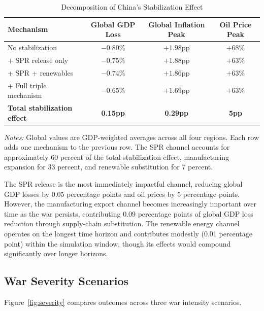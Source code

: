 \documentclass[12pt,a4paper]{article}
\begin{document}
\begin{table}[H]
\centering
\small
\begin{threeparttable}
\caption{Decomposition of China's Stabilization Effect}
\label{tab:china_decomp}
\begin{tabular}{@{}lccc@{}}
\toprule
Mechanism & Global GDP Loss & Global Inflation Peak & Oil Price Peak \\
\midrule
No stabilization & $-0.80\%$ & $+1.98$pp & $+68\%$ \\
\quad + SPR release only & $-0.75\%$ & $+1.88$pp & $+63\%$ \\
\quad + SPR + renewables & $-0.74\%$ & $+1.86$pp & $+63\%$ \\
\quad + Full triple mechanism & $-0.65\%$ & $+1.69$pp & $+63\%$ \\
\addlinespace
\textbf{Total stabilization effect} & \textbf{0.15pp} & \textbf{0.29pp} & \textbf{5pp} \\
\bottomrule
\end{tabular}
\begin{tablenotes}[flushleft]
\small
\item \textit{Notes:} Global values are GDP-weighted averages across all four regions. Each row adds one mechanism to the previous row. The SPR channel accounts for approximately 60 percent of the total stabilization effect, manufacturing expansion for 33 percent, and renewable substitution for 7 percent.
\end{tablenotes}
\end{threeparttable}
\end{table}

The SPR release is the most immediately impactful channel, reducing global GDP losses by 0.05 percentage points and oil prices by 5 percentage points. However, the manufacturing export channel becomes increasingly important over time as the war persists, contributing 0.09 percentage points of global GDP loss reduction through supply-chain substitution. The renewable energy channel operates on the longest time horizon and contributes modestly (0.01 percentage point) within the simulation window, though its effects would compound significantly over longer horizons.

\subsection{War Severity Scenarios}

Figure~\ref{fig:severity} compares outcomes across three war intensity scenarios.
\end{document}

